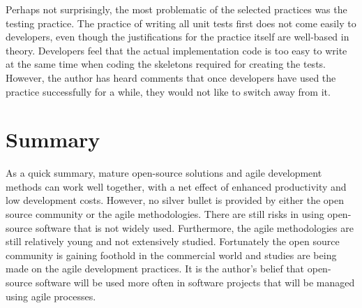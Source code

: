 Perhaps not surprisingly, the most problematic of the selected 
 practices was the testing practice. The practice of 
writing all unit tests first does not come easily to developers, even 
though the justifications for the practice itself are well-based in 
theory. Developers feel that the actual implementation code is too 
easy to write at the same time when coding the skeletons required for 
creating the tests. However, the author has heard comments that once 
developers have used the practice successfully for a while, they would 
not like to switch away from it.


\section{Summary}
\label{toc:conclusions:summary}

As a quick summary, mature open-source solutions and agile development 
methods can work well together, with a net effect of enhanced 
productivity and low development costs. However, no silver bullet is 
provided by either the open source community or the agile 
methodologies. There are still risks in using open-source software 
that is not widely used. Furthermore, the agile methodologies are 
still relatively young and not extensively studied. Fortunately the 
open source community is gaining foothold in the commercial world and 
studies are being made on the agile development practices. It is the 
author's belief that open-source software will be used more often in 
software projects that will be managed using agile processes.


